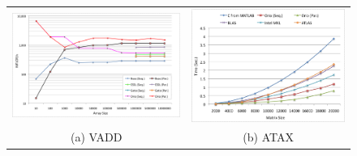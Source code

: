 \documentclass[runningheads]{llncs}
\begin{document}
\begin{figure}[htp]
{\small
\centering
\begin{tabular}{cc}

\begin{minipage}[b]{.515\textwidth}
\includegraphics[width=\textwidth]{figures/vadd_bgp.png}
\end{minipage}
&
\begin{minipage}[b]{.515\textwidth}
\includegraphics[width=\textwidth]{figures/atax.png}
\end{minipage}\\

(a) VADD & (b) ATAX \\


\end{tabular}}
\end{figure}
\end{document}
